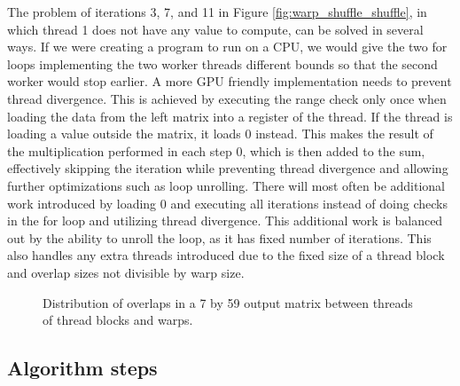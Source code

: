 The problem of iterations 3, 7, and 11 in Figure \ref{fig:warp_shuffle_shuffle}, in which thread 1 does not have any value to compute, can be solved in several ways. If we were creating a program to run on a CPU, we would give the two for loops implementing the two worker threads different bounds so that the second worker would stop earlier. A more GPU friendly implementation needs to prevent thread divergence. This is achieved by executing the range check only once when loading the data from the left matrix into a register of the thread. If the thread is loading a value outside the matrix, it loads 0 instead. This makes the result of the multiplication performed in each step 0, which is then added to the sum, effectively skipping the iteration while preventing thread divergence and allowing further optimizations such as loop unrolling. There will most often be additional work introduced by loading 0 and executing all iterations instead of doing checks in the for loop and utilizing thread divergence. This additional work is balanced out by the ability to unroll the loop, as it has fixed number of iterations. This also handles any extra threads introduced due to the fixed size of a thread block and overlap sizes not divisible by warp size.

\begin{figure}[ht]
	\centering
	\def\svgwidth{0.8\textwidth}
	
	\caption{Distribution of overlaps in a 7 by 59 output matrix between threads of thread blocks and warps.}
	\label{fig:warp_shuffle_simple_dist}
\end{figure}

\subsection{Algorithm steps}
\label{sec:simplified_warp_shuffle_steps}


